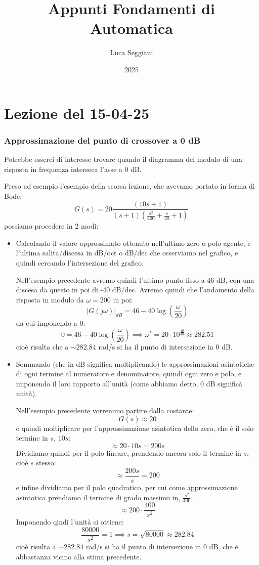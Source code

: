 \documentclass[a4paper,11pt]{article}
\title{Appunti Fondamenti di Automatica}
\author{Luca Seggiani}
\date{2025}
\begin{document}
\section{Lezione del 15-04-25}

\thispagestyle{empty}
\pagestyle{fancy}

\subsubsection{Approssimazione del punto di crossover a 0 dB}
Potrebbe esserci di interesse trovare quando il diagramma del modulo di una risposta in frequenza interseca l'asse a 0 dB.

Preso ad esempio l'esempio della scorsa lezione, che avevamo portato in forma di Bode:
$$
G(s) = 20 \frac{\left( 10s + 1 \right)}{ (s + 1) \left( \frac{s^2}{400} + \frac{s}{20} + 1 \right) } 
$$
possiamo procedere in 2 modi:
\begin{itemize}
	\item Calcolando il valore approssimato ottenuto nell'ultimo zero o polo agente, e l'ultima salita/discesa in dB/oct o dB/dec che osserviamo nel grafico, e quindi cercando l'intersezione del grafico.

Nell'esempio precedente avremo quindi l'ultimo punto fisso a 46 dB, con una discesa da questo in poi di -40 dB/dec.
Avremo quindi che l'andamento della risposta in modulo da $\omega = 200$ in poi:
$$
|G(j \omega)|_{dB} = 46 - 40 \log\left( \frac{\omega}{20} \right)
$$
da cui imponendo a 0:
$$
0 = 46 - 40 \log\left( \frac{\omega}{20} \right) \implies \omega^* = 20 \cdot 10^{\frac{46}{40}} \approx 282.51
$$
cioè risulta che a $\sim 282.84$ rad/s si ha il punto di intersezione in 0 dB.
		
	\item Sommando (che in dB significa moltiplicando) le approssimazioni asintotiche di ogni termine al numeratore e denominatore, quindi ogni zero e polo, e imponendo il loro rapporto all'unità (come abbiamo detto, 0 dB significà unità).
		
Nell'esempio precedente vorremmo partire dalla costante:
$$
G(s) \approx 20
$$
e quindi moltiplicare per l'approssimazione asintotica dello zero, che è il solo termine in $s$, $10s$:
$$
\approx 20 \cdot 10s = 200s
$$
Dividiamo quindi per il polo lineare, prendendo ancora solo il termine in $s$, cioè $s$ stesso:
$$
\approx \frac{200s}{s} = 200
$$
e infine dividiamo per il polo quadratico, per cui come approssimazione asintotica prendiamo il termine di grado massimo in, $\frac{s^2}{400}$:
$$
\approx 200 \cdot \frac{400}{s^2}
$$
Imponendo qindi l'unità si ottiene:
$$
\frac{80000}{s^2} = 1 \implies s = \sqrt{80000} \approx 282.84
$$
cioè risulta a $\sim 282.84$ rad/s si ha il punto di intersezione in 0 dB, che è abbastanza vicino alla stima precedente.
\end{itemize}
\end{document}
